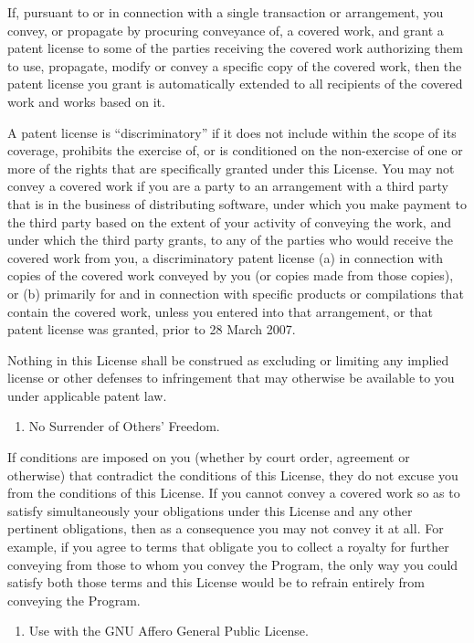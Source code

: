 \documentclass[letterpaper,10pt,english]{sphinxmanual}
\begin{document}
If, pursuant to or in connection with a single transaction or
arrangement, you convey, or propagate by procuring conveyance of, a
covered work, and grant a patent license to some of the parties
receiving the covered work authorizing them to use, propagate, modify
or convey a specific copy of the covered work, then the patent license
you grant is automatically extended to all recipients of the covered
work and works based on it.

A patent license is “discriminatory” if it does not include within
the scope of its coverage, prohibits the exercise of, or is
conditioned on the non-exercise of one or more of the rights that are
specifically granted under this License.  You may not convey a covered
work if you are a party to an arrangement with a third party that is
in the business of distributing software, under which you make payment
to the third party based on the extent of your activity of conveying
the work, and under which the third party grants, to any of the
parties who would receive the covered work from you, a discriminatory
patent license (a) in connection with copies of the covered work
conveyed by you (or copies made from those copies), or (b) primarily
for and in connection with specific products or compilations that
contain the covered work, unless you entered into that arrangement,
or that patent license was granted, prior to 28 March 2007.

Nothing in this License shall be construed as excluding or limiting
any implied license or other defenses to infringement that may
otherwise be available to you under applicable patent law.
\begin{enumerate}
%
\setcounter{enumi}{11}
\item {} 
No Surrender of Others’ Freedom.

\end{enumerate}

If conditions are imposed on you (whether by court order, agreement or
otherwise) that contradict the conditions of this License, they do not
excuse you from the conditions of this License.  If you cannot convey a
covered work so as to satisfy simultaneously your obligations under this
License and any other pertinent obligations, then as a consequence you may
not convey it at all.  For example, if you agree to terms that obligate you
to collect a royalty for further conveying from those to whom you convey
the Program, the only way you could satisfy both those terms and this
License would be to refrain entirely from conveying the Program.
\begin{enumerate}
%
\setcounter{enumi}{12}
\item {} 
Use with the GNU Affero General Public License.

\end{enumerate}
\end{document}
